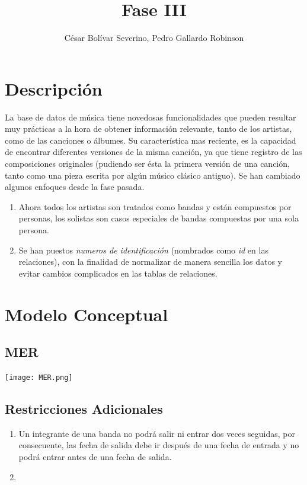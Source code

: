 \documentclass[10pt,a4paper]{article}
\author{César Bolívar Severino, Pedro Gallardo Robinson} %
\title{Fase III}
\begin{document}
\maketitle

\section{Descripción}

La base de datos de música tiene novedosas funcionalidades que pueden resultar muy prácticas a la hora de obtener información relevante, tanto de los artistas, como de las canciones o álbumes.
Su característica mas reciente, es la capacidad de encontrar diferentes versiones de la misma canción, ya que tiene registro de las composiciones originales (pudiendo ser ésta la primera versión de una canción, tanto como una pieza escrita por algún músico clásico antiguo).
\newline
Se han cambiado algunos enfoques desde la fase pasada.
\begin{enumerate}
	\item Ahora todos los artistas son tratados como bandas y están compuestos por personas, los solistas son casos especiales de bandas compuestas por una sola persona.
	\item Se han puestos \textit{numeros de identificación} (nombrados como \textit{id} en las relaciones), con la finalidad de normalizar de manera sencilla los datos y evitar cambios complicados en las tablas de relaciones.
\end{enumerate}

\newpage

\section{Modelo Conceptual}

\subsection{MER}
\begin{center}
\texttt{[image: MER.png]}
\end{center}

\subsection{Restricciones Adicionales}
 \begin{enumerate}
 \item Un integrante de una banda no podrá salir ni entrar dos veces seguidas, por consecuente, las fecha de salida debe ir después de una fecha de entrada y no podrá entrar antes de una fecha de salida.
 \item
 \end{enumerate}
\newpage
\end{document}
